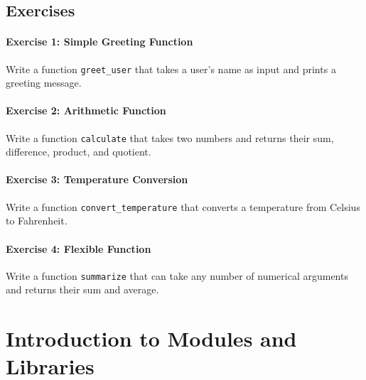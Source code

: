 \documentclass[
  letterpaper,
  DIV=11,
  numbers=noendperiod]{scrreprt}
\begin{document}
\hypertarget{exercises-4}{%
\section{Exercises}\label{exercises-4}}

\hypertarget{exercise-1-simple-greeting-function}{%
\subsubsection{Exercise 1: Simple Greeting
Function}\label{exercise-1-simple-greeting-function}}

Write a function \texttt{greet\_user} that takes a user's name as input
and prints a greeting message.

\hypertarget{exercise-2-arithmetic-function}{%
\subsubsection{Exercise 2: Arithmetic
Function}\label{exercise-2-arithmetic-function}}

Write a function \texttt{calculate} that takes two numbers and returns
their sum, difference, product, and quotient.

\hypertarget{exercise-3-temperature-conversion}{%
\subsubsection{Exercise 3: Temperature
Conversion}\label{exercise-3-temperature-conversion}}

Write a function \texttt{convert\_temperature} that converts a
temperature from Celsius to Fahrenheit.

\hypertarget{exercise-4-flexible-function}{%
\subsubsection{Exercise 4: Flexible
Function}\label{exercise-4-flexible-function}}

Write a function \texttt{summarize} that can take any number of
numerical arguments and returns their sum and average.


\hypertarget{sec-libraries}{%
\chapter{Introduction to Modules and Libraries}\label{sec-libraries}}
\end{document}
